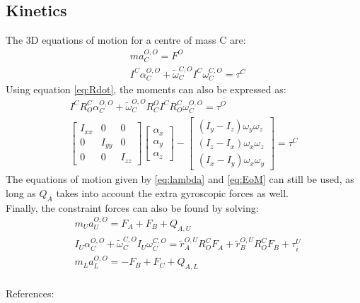 \subsection{Kinetics}

The 3D equations of motion for a centre of mass C are:
\begin{equation}
\begin{aligned}
&m a_C^{O,O}=F^O \\
&I^C \alpha_C^{O,O}+\tilde{\omega}_C^{C,O} I^C \omega_C^{C,O}=\tau^C
\end{aligned}
\end{equation}
Using equation \ref{eq:Rdot}, the moments can also be expressed as:
\begin{align*}
I^C R^C_O\alpha_C^{O,O}+\tilde{\omega}_C^{O,O} R^O_C I^C R^C_O \omega_C^{O,O}=\tau^O \\
\begin{bmatrix}
I_{xx} & 0 & 0 \\
0   & I_{yy} & 0 \\
0 & 0 & I_{zz}
\end{bmatrix}
\begin{bmatrix}
\alpha_x \\
\alpha_y \\
\alpha_z
\end{bmatrix}
-
\begin{bmatrix}
(I_y-I_z)\omega_y \omega_z \\
(I_z-I_x)\omega_x \omega_z \\
(I_x-I_y)\omega_x \omega_y
\end{bmatrix}
=\tau^C
\end{align*}
The equations of motion given by \ref{eq:lambda} and \ref{eq:EoM} can still be used, as long as $Q_A$ takes into account the extra gyroscopic forces as well.\\

Finally, the constraint forces can also be found by solving:
\begin{equation}
\begin{aligned}
&m_U a_U^{O,O} = F_A + F_B +Q_{A,U} \\
&I_U \alpha_C^{O,O}+\tilde{\omega}_C^{C,O} I_U \omega_C^{C,O} = \tilde{r}_A^{O,U}R^C_OF_A+\tilde{r}_B^{O,U}R^C_O F_B+\tau_i^U\\
&m_L a_L^{O,O} = -F_B + F_C +Q_{A,L} \\
\end{aligned}
\end{equation}




References: \cite{Schilder2018} \cite{Hibbeler2013}